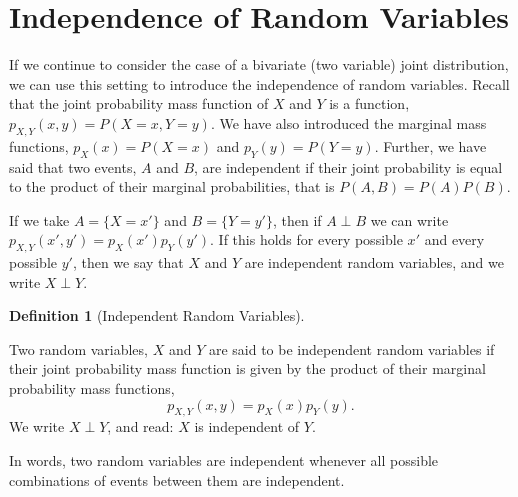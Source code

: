 \documentclass[
  letterpaper,
  DIV=11,
  numbers=noendperiod]{scrreprt}
\theoremstyle{definition}
\newtheorem{definition}{Definition}[chapter]
\theoremstyle{definition}
\theoremstyle{definition}
\theoremstyle{remark}
\begin{document}
\section{Independence of Random
Variables}\label{independence-of-random-variables}

If we continue to consider the case of a bivariate (two variable) joint
distribution, we can use this setting to introduce the independence of
random variables. Recall that the joint probability mass function of
\(X\) and \(Y\) is a function, \(p_{X,Y}(x,y) = P(X = x, Y = y)\). We
have also introduced the marginal mass functions, \(p_X(x) = P(X = x)\)
and \(p_Y(y) = P(Y = y)\). Further, we have said that two events, \(A\)
and \(B\), are independent if their joint probability is equal to the
product of their marginal probabilities, that is \(P(A,B) = P(A)P(B)\).

If we take \(A=\{X=x'\}\) and \(B=\{Y=y'\}\), then if \(A\perp B\) we
can write \(p_{X,Y}(x',y')=p_X(x')p_Y(y')\). If this holds for every
possible \(x'\) and every possible \(y'\), then we say that \(X\) and
\(Y\) are independent random variables, and we write \(X \perp Y\).

\begin{definition}[Independent Random
Variables]\protect\hypertarget{def-independent-rv}{}\label{def-independent-rv}

Two random variables, \(X\) and \(Y\) are said to be independent random
variables if their joint probability mass function is given by the
product of their marginal probability mass functions,
\[p_{X,Y}(x,y) = p_X(x)p_Y(y).\] We write \(X\perp Y\), and read: \(X\)
is independent of \(Y\).

\end{definition}

In words, two random variables are independent whenever all possible
combinations of events between them are independent.
\end{document}
